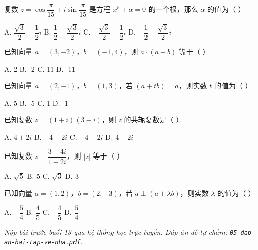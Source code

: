 \documentclass[11pt, a4paper]{article}
\begin{document}
\begin{baitap}[10]
复数 $z = \cos\dfrac{\pi}{15} + i\sin\dfrac{\pi}{15}$ 是方程 $x^5 + \alpha = 0$ 的一个根，那么 $\alpha$ 的值为（ ）
\par\vspace{3pt}
\noindent A. $\dfrac{\sqrt{3}}{2} + \dfrac{1}{2}i$ \quad B. $\dfrac{1}{2} + \dfrac{\sqrt{3}}{2}i$ \quad C. $-\dfrac{\sqrt{3}}{2} - \dfrac{1}{2}i$ \quad D. $-\dfrac{1}{2} - \dfrac{\sqrt{3}}{2}i$
\end{baitap}

\begin{baitap}[11]
已知向量 $a = (3,-2)$，$b = (-1,4)$，则 $a \cdot (a + b)$ 等于（ ）
\par\vspace{3pt}
\noindent A. 2 \quad B. -2 \quad C. 11 \quad D. -11
\end{baitap}

\begin{baitap}[12]
已知向量 $a = (2,-1)$，$b = (1,3)$，若 $(a + tb) \perp a$，则实数 $t$ 的值为（ ）
\par\vspace{3pt}
\noindent A. 5 \quad B. -5 \quad C. 1 \quad D. -1
\end{baitap}

\begin{baitap}[13]
已知复数 $z = (1+i)(3-i)$，则 $z$ 的共轭复数是（ ）
\par\vspace{3pt}
\noindent A. $4 + 2i$ \quad B. $-4 + 2i$ \quad C. $-4 - 2i$ \quad D. $4 - 2i$
\end{baitap}

\begin{baitap}[14]
已知复数 $z = \dfrac{3 + 4i}{1 - 2i}$，则 $\lvert z \rvert$ 等于（ ）
\par\vspace{3pt}
\noindent A. $\sqrt{5}$ \quad B. 5 \quad C. $\sqrt{3}$ \quad D. 3
\end{baitap}

\begin{baitap}[15]
已知向量 $a = (1,2)$，$b = (2,-3)$，若 $a \perp (a + \lambda b)$，则实数 $\lambda$ 的值为（ ）
\par\vspace{3pt}
\noindent A. $-\dfrac{5}{4}$ \quad B. $\dfrac{4}{5}$ \quad C. $-\dfrac{4}{5}$ \quad D. $\dfrac{5}{4}$
\end{baitap}

\vspace{0.3cm}
\noindent\emph{Nộp bài trước buổi 13 qua hệ thống học trực tuyến. Đáp án để tự chấm: \texttt{05-dap-an-bai-tap-ve-nha.pdf}.}
\end{document}
